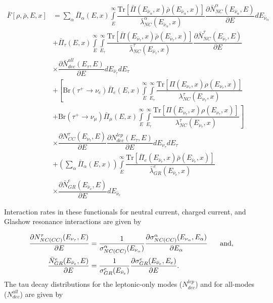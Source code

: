 \documentclass[main.tex]{subfiles}
\begin{document}
\begin{equation}\begin{split}
    \bar{F}\left[\rho,\bar{\rho}, E, x\right] &= \sum\limits_{\alpha}\bar{\Pi}_{\alpha}(E,x)\int\limits_{E}^{\infty}\dfrac{\text{Tr}\left[ \bar{\Pi}(E_{\bar{\nu}_{\alpha}}, x) \bar{\rho}(E_{\bar{\nu}_{\alpha}}, x) \right]}{\bar{\lambda}_{NC}^{\alpha}(E_{\bar{\nu}_{\alpha} }, x)}\dfrac{\partial\bar{N}_{NC}^{\alpha}(E_{\bar{\nu}_{\alpha}}, E)}{\partial E} d E_{\bar{\nu}_{\alpha}} \\ 
    &+ \bar{\Pi}_{\tau} (E,x) \int\limits_{E}^{\infty}\int\limits_{E_{\tau}}^{\infty}\dfrac{\text{Tr}\left[ \bar{\Pi}(E_{\bar{\nu}_{\tau}}, x) \bar{\rho}(E_{\bar{\nu}_{\tau}}, x) \right]}{\bar{\lambda}_{NC}^{\tau}(E_{\bar{\nu}_{\tau} }, x)}\dfrac{\partial\bar{N}_{NC}^{\tau}(E_{\bar{\nu}_{\tau}}, E)}{\partial E} \\
    &\times \dfrac{\partial\bar{N}_{dec}^{all}(E_{\tau}, E)}{\partial E} dE_{\bar{\nu}_{\tau}} dE_{\tau} \\
    &+ \left[ \text{Br}\left(\tau^{+} \to \nu_{e}\right)\bar{\Pi}_{e}(E,x)\int\limits_{E}^{\infty}\int\limits_{E_{\tau}}^{\infty} \dfrac{\text{Tr}\left[\Pi(E_{\nu_{\tau}}, x)\rho(E_{\nu_{\tau}}, x) \right] }{\lambda_{NC}^{\tau}(E_{\nu_{\tau}}, x)}  \right. \\
    &+ \left.\text{Br}\left(\tau^{+} \to \nu_{\mu}\right)\bar{\Pi}_{\mu}(E,x)\int\limits_{E}^{\infty}\int\limits_{E_{\tau}}^{\infty} \dfrac{\text{Tr}\left[\Pi(E_{\nu_{\tau}}, x)\rho(E_{\nu_{\tau}}, x) \right] }{\lambda_{NC}^{\tau}(E_{\nu_{\tau}}, x)}  \right] \\
    &\times \dfrac{\partial N_{CC}^{\tau}(E_{\nu_{\tau}}, E)}{\partial E} \dfrac{\partial N_{dec}^{lep}(E_{\tau}, E)}{\partial E} dE_{\nu_{\tau}} dE_{\tau} \\
    &+\left(\sum\limits_{\alpha} \bar{\Pi}_{\alpha} (E,x)\right) \int\limits_{E}^{\infty} \dfrac{\text{Tr}\left[\bar{\Pi}_{e}(E_{\bar{\nu}_{e}}, x) \bar{\rho}(E_{\bar{\nu}_{e}}, x) \right]}{\bar{\lambda}_{GR}^{e} (E_{\bar{\nu}_{e}}, x)}  \\
    &\times \dfrac{\partial\bar{N}_{GR}^{e}(E_{\bar{\nu}_{e}}, E)}{\partial E} dE_{\bar{\nu}_{e}}
\end{split}\end{equation}

Interaction rates in these functionals for neutral current, charged current, and Glashow resonance interactions are given by 

\begin{align}
    \dfrac{\partial N_{NC(CC)}^{\tau} (E_{\nu_{\tau}}, E)}{\partial E} &= \dfrac{1}{\sigma_{NC(CC)}^{\alpha} (E_{\nu_{\alpha} })}\dfrac{\partial\sigma_{NC(CC)}^{\alpha}(E_{\nu_{\alpha}}, E_{\alpha})}{\partial E_{\alpha}}\hspace{0.5cm} \text{ and}, \\
    \dfrac{\bar{N}_{GR}^{e} (E_{\bar{\nu}_{e}}, E)}{\partial E} &= \dfrac{1}{\sigma_{GR}^{e}(E_{\bar{\nu}_{e}})} \dfrac{\partial\sigma_{GR}^{e}(E_{\bar{\nu}_{e}}, E_{e})}{\partial E}.
\end{align}
The tau decay distributions for the leptonic-only modes ($N_{dec}^{lep}$) and for all-modes ($N_{dec}^{all}$) are given by 
\end{document}
